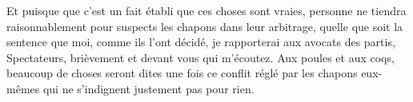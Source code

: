 \documentclass[12pt]{book}
\begin{document}
\begin{pages}
\begin{Rightside}
                        Et puisque que c’est un fait établi que ces choses sont vraies, personne ne tiendra raisonnablement pour suspects les chapons dans leur arbitrage, quelle que soit la sentence que moi, comme ils l’ont décidé, je rapporterai aux avocats des partis, Spectateurs, brièvement et devant vous qui m’écoutez.
                        Aux poules et aux coqs, beaucoup de choses seront dites une fois ce conflit réglé par les chapons eux-mêmes qui ne s’indignent justement pas pour rien. 
                    \pend
        \endnumbering
        \end{Rightside}
        \end{pages}
        \Pages
        
\end{document}

